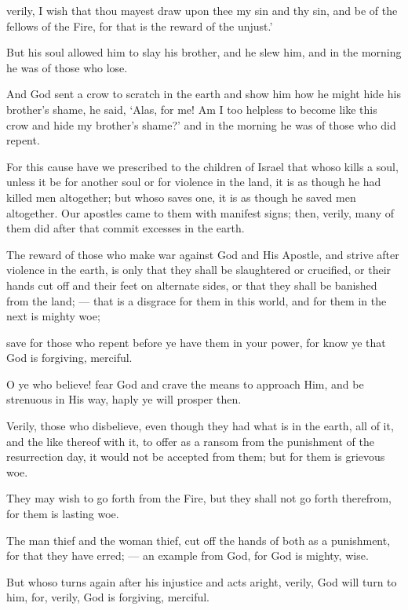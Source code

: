 \documentclass[fontsize=14pt, letterpaper, notitlepage, openany, DIV=12]{scrbook} %
\begin{document}
\noindent[5:29]
verily, I wish that thou mayest draw upon thee my sin and thy sin, and be of the fellows
of the Fire, for that is the reward of the unjust.'

\noindent[5:30]
But his soul allowed him to slay his brother, and he slew him, and in the morning he was
of those who lose.

\noindent[5:31]
And God sent a crow to scratch in the earth and show him how he might hide his
brother's shame, he said, `Alas, for me! Am I too helpless to become like this crow and hide my
brother's shame?' and in the morning he was of those who did repent.

\noindent[5:32]
For this cause have we prescribed to the children of Israel that whoso kills a soul, unless
it be for another soul or for violence in the land, it is as though he had killed men altogether; but
whoso saves one, it is as though he saved men altogether. Our apostles came to them with
manifest signs; then, verily, many of them did after that commit excesses in the earth.

\noindent[5:33]
The reward of those who make war against God and His Apostle, and strive after
violence in the earth, is only that they shall be slaughtered or crucified, or their hands cut off and
their feet on alternate sides, or that they shall be banished from the land; --- that is a disgrace for
them in this world, and for them in the next is mighty woe;

\noindent[5:34]
save for those who repent before ye have them in your power, for know ye that God is
forgiving, merciful.

\noindent[5:35]
O ye who believe! fear God and crave the means to approach Him, and be strenuous in
His way, haply ye will prosper then.

\noindent[5:36]
Verily, those who disbelieve, even though they had what is in the earth, all of it, and the
like thereof with it, to offer as a ransom from the punishment of the resurrection day, it would
not be accepted from them; but for them is grievous woe.

\noindent[5:37]
They may wish to go forth from the Fire, but they shall not go forth therefrom, for them
is lasting woe.

\noindent[5:38]
The man thief and the woman thief, cut off the hands of both as a punishment, for that
they have erred; --- an example from God, for God is mighty, wise.

\noindent[5:39]
But whoso turns again after his injustice and acts aright, verily, God will turn to him, for,
verily, God is forgiving, merciful.
\end{document}
